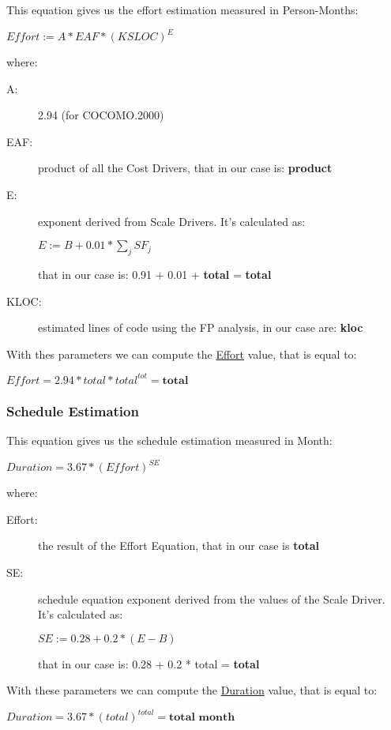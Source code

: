 This equation gives us the effort estimation measured in Person-Months:
\begin{center}
	$ Effort := A * EAF * (KSLOC)^{E} $
\end{center}
where:
\begin{description}
	\item [A:] {2.94 (for COCOMO.2000) }
	\item [EAF:] {product of all the Cost Drivers, that in our case is: \textbf{product}} 
	\item [E:] {exponent derived from Scale Drivers. It's calculated as:
		\begin{center}
			$ E := B + 0.01 * \sum_{j} SF_{j} $
		\end{center}
		that in our case is: 0.91 + 0.01 + \textbf{total} = \textbf{total} }
	\item [KLOC:] {estimated lines of code using the FP analysis, in our case are: \textbf{kloc}}
\end{description}
With thes parameters we can compute the \underline{Effort} value, that is equal to:
\begin{center}
	$ Effort = 2.94 * total * total^{tot} = \textbf{total} $
\end{center}

\vfill
\subsubsection{Schedule Estimation}

This equation gives us the schedule estimation measured in Month:
\begin{center}
	$ Duration = 3.67 * (Effort)^{SE}$ 
\end{center}
where: 
\begin{description}
	\item [Effort:] {the result of the Effort Equation, that in our case is \textbf{total} }
	\item [SE:] {schedule equation exponent derived from the values of the Scale Driver. It's calculated as:
		\begin{center}
			$ SE := 0.28 + 0.2 * (E - B) $
		\end{center}
	that in our case is: 0.28 + 0.2 * total = \textbf{total} }
\end{description}
With these parameters we can compute the \underline{Duration} value, that is equal to:
\begin{center}
	$ Duration = 3.67 * (total)^{total} = \textbf{total month} $ \\
\end{center}